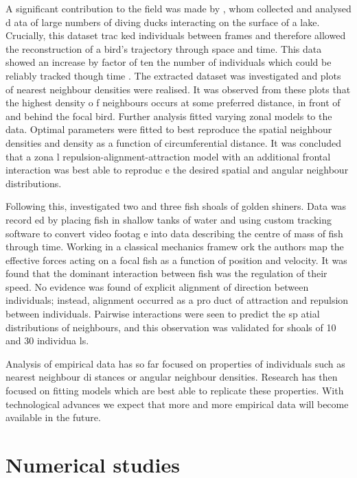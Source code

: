 A significant contribution to the field was made by \textcite{lukeman10}, whom collected and analysed d
ata of large numbers of diving ducks interacting on the surface of a lake. Crucially, this dataset trac
ked individuals between frames and therefore allowed the reconstruction of a bird's trajectory through 
space and time. This data showed an increase by factor of ten the number of individuals which could be 
reliably tracked though time \parencite{lukeman09}. The extracted dataset was investigated and plots of
 nearest neighbour densities were realised. It was observed from these plots that the highest density o
f neighbours occurs at some preferred distance, in front of and behind the focal bird. Further analysis
 fitted varying zonal models to the data. Optimal parameters were fitted to best reproduce the spatial 
neighbour densities and density as a function of circumferential distance. It was concluded that a zona
l repulsion-alignment-attraction model with an additional frontal interaction was best able to reproduc
e the desired spatial and angular neighbour distributions.

Following this, \cite{katz11} investigated two and three fish shoals of golden shiners. Data was record
ed by placing fish in shallow tanks of water and using custom tracking software to convert video footag
e into data describing the centre of mass of fish through time. Working in a classical mechanics framew
ork the authors map the effective forces acting on a focal fish as a function of position and velocity.
 It was found that the dominant interaction between fish was the regulation of their speed. No evidence
 was found of explicit alignment of direction between individuals; instead, alignment occurred as a pro
duct of attraction and repulsion between individuals. Pairwise interactions were seen to predict the sp
atial distributions of neighbours, and this observation was validated for shoals of 10 and 30 individua
ls.

Analysis of empirical data has so far focused on properties of individuals such as nearest neighbour di
stances or angular neighbour densities. Research has then focused on fitting models which are best able
 to replicate these properties. With technological advances we expect that more and more empirical data
 will become available in the future.

\section{Numerical studies}
\label{sec:numerical_studies}

